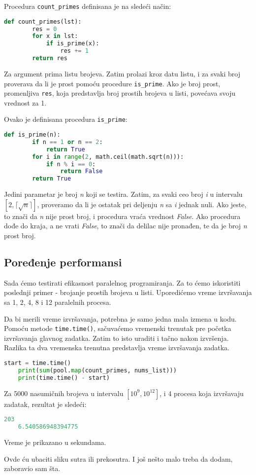 \documentclass[a4paper]{article}
\begin{document}
{    \par Procedura \lstinline{count_primes} definisana je na sledeći način:
    \begin{lstlisting}[showstringspaces=false, language=Python]
    def count_primes(lst):
        res = 0
        for x in lst:
            if is_prime(x): 
                res += 1
        return res
    \end{lstlisting}
    Za argument prima listu brojeva. Zatim prolazi kroz datu listu, i za svaki broj proverava da li je prost pomoću procedure  \lstinline{is_prime}. Ako je broj prost, promenljiva \lstinline{res}, koja predstavlja broj prostih brojeva u listi, povećava svoju vrednost za 1. 
    \par Ovako je definisana procedura \lstinline{is_prime}:
    \begin{lstlisting}[showstringspaces=false, language=Python]
    def is_prime(n):
        if n == 1 or n == 2:
            return True
        for i in range(2, math.ceil(math.sqrt(n))):
            if n % i == 0:
                return False
        return True
    \end{lstlisting}
    Jedini parametar je broj \emph{n} koji se testira. Zatim, za svaki ceo broj \emph{i} u intervalu $\left [ 2, \lceil\sqrt{n} \rceil \right ]$, proveramo da li je ostatak pri deljenju \emph{n} sa \emph{i} jednak nuli. Ako jeste, to znači da \emph{n} nije prost broj, i procedura vraća vrednost \emph{False}. Ako procedura dođe do kraja, a ne vrati \emph{False}, to znači da delilac nije pronađen, te da je broj \emph{n} prost broj.
    \subsection{Poređenje performansi}
    Sada ćemo testirati efikasnost paralelnog programiranja. Za to ćemo iskoristiti poslednji primer - brojanje prostih brojeva u listi. Uporedićemo vreme izvršavanja sa 1, 2, 4, 8 i 12 paralelnih procesa.
    \par Da bi merili vreme izvršavanja, potrebna je samo jedna mala izmena u kodu. Pomoću metode \lstinline{time.time()}, sačuvaćemo vremenski trenutak pre početka izvršavanja glavnog zadatka. Zatim to isto uraditi i tačno nakon izvršenja. Razlika ta dva vremenska trenutna predstavlja vreme izvršavanja zadatka.
    \begin{lstlisting}[showstringspaces=false, language=Python]
    start = time.time()
    print(sum(pool.map(count_primes, nums_list)))
    print(time.time() - start)
    \end{lstlisting}
    Za 5000 nasumičnih brojeva u intervalu $\left [ 10^{9}, 10^{12} \right ]$, i 4 procesa koja izvršavaju zadatak, rezultat je sledeći:
    \begin{lstlisting}[showstringspaces=false, language=Python]
    203
    6.540586948394775
    \end{lstlisting}
    Vreme je prikazano u sekundama.
    \par Ovde ću ubaciti sliku sutra ili prekosutra. I još nešto malo treba da dodam, zaboravio sam šta.
	
}
\end{document}
